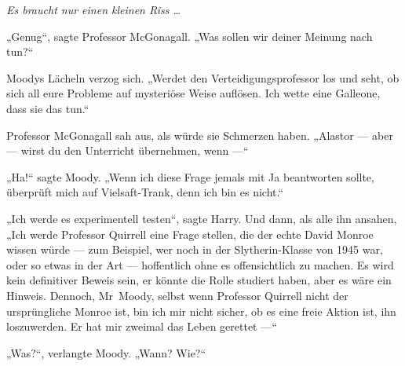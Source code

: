 \emph{Es braucht nur einen kleinen Riss …}

„Genug“, sagte Professor McGonagall.
„Was sollen wir deiner Meinung nach tun?“

Moodys Lächeln verzog sich.
„Werdet den Verteidigungsprofessor los und seht, ob sich all eure Probleme auf mysteriöse Weise auflösen. Ich wette eine Galleone, dass sie das tun.“

Professor McGonagall sah aus, als würde sie Schmerzen haben.
„Alastor — aber — wirst du den Unterricht übernehmen, wenn —“

„Ha!“ sagte Moody.
„Wenn ich diese Frage jemals mit Ja beantworten sollte, überprüft mich auf Vielsaft-Trank, denn ich bin es nicht.“

„Ich werde es experimentell testen“, sagte Harry. Und dann, als alle ihn ansahen,
„Ich werde Professor Quirrell eine Frage stellen, die der echte David Monroe wissen würde — zum Beispiel, wer noch in der Slytherin-Klasse von 1945 war, oder so etwas in der Art — hoffentlich ohne es offensichtlich zu machen. Es wird kein definitiver Beweis sein, er könnte die Rolle studiert haben, aber es wäre ein Hinweis. Dennoch, Mr~Moody, selbst wenn Professor Quirrell nicht der ursprüngliche Monroe ist, bin ich mir nicht sicher, ob es eine freie Aktion ist, ihn loszuwerden. Er hat mir zweimal das Leben gerettet —“

„Was?“, verlangte Moody.
„Wann? Wie?“

